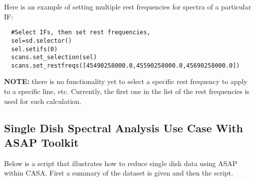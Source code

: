 Here is an example of setting multiple rest frequencies for spectra of a particular IF:

\small
\begin{verbatim}
  #Select IFs, then set rest frequencies,
  sel=sd.selector()
  sel.setifs(0)
  scans.set_selection(sel)
  scans.set_restfreqs([45490258000.0,45590258000.0,45690258000.0])
\end{verbatim}
\normalsize

{\bf NOTE:} there is no functionality yet to select a specific rest frequency 
to apply to a specific line, etc. Currently, the first one in the list
of the rest frequencies is used for such calculation.

 
\subsection{Single Dish Spectral Analysis Use Case With ASAP Toolkit}
\label{subsection:sd.asap.usecase}

Below is a script that illustrates how to reduce single dish data
using ASAP within CASA.  First a summary of the dataset is given and
then the script.

